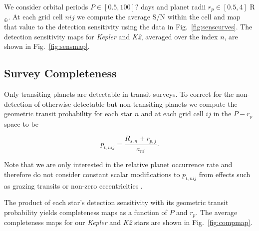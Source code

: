 \documentclass[twocolumn]{emulateapj}
\newcommand{\kepler}[1]{\emph{Kepler}#1}
\newcommand{\ktwo}[1]{\emph{K2}#1}
\begin{document}
We consider orbital periods $P \in [0.5,100]?$ days and planet radii $r_p \in [0.5,4]$ R$_{\oplus}$. At
each grid cell $nij$ we compute the average S/N within the cell and map that value to the detection sensitivity
using the data in Fig.~\ref{fig:senscurves}. The detection sensitivity maps for \kepler{} and \ktwo{,}
averaged over the index $n$, are shown in Fig.~\ref{fig:sensmap}.

 

\begin{figure*}
  \centering
  \caption{Average detection sensitivity versus orbital period and planetary radius.
    The detection sensitivity maps averaged over \kepler{} stars (\emph{left panel)} and over \ktwo{} stars
    (\emph{right panel}) from our sample of low mass dwarf stars.} 
  \label{fig:sensmap}
\end{figure*}


\subsection{Survey Completeness}
Only transiting planets are detectable in transit surveys. To correct for the non-detection of otherwise
detectable but non-transiting planets we compute
the geometric transit probability for each star $n$ and at each grid cell $ij$ in the $P-r_p$ space to be

\begin{equation}
  p_{t,nij} = \frac{R_{s,n} + r_{p,j}}{a_{ni}}. \label{eq:ptransit}
\end{equation}

\noindent Note that we are only interested in the relative planet occurrence rate and therefore do not consider
constant scalar modifications to $p_{t,nij}$ from effects such as grazing transits or non-zero eccentricities 
\citep{barnes07b}.

The product of each star's detection sensitivity with its geometric transit probability yields completeness
maps as a function of $P$ and $r_p$. The average completeness maps for our \kepler{} and \ktwo{} stars are
shown in Fig.~\ref{fig:compmap}.

\begin{figure*}
  \centering
  \caption{Average completeness versus orbital period and planetary radius.
    Maps of the product of the detection sensitivity and geometric transit probability averaged over \kepler{} stars
    (\emph{left panel)} and over \ktwo{} stars (\emph{right panel}) from our sample of low mass dwarf stars.} 
  \label{fig:compmap}
\end{figure*}
\end{document}
